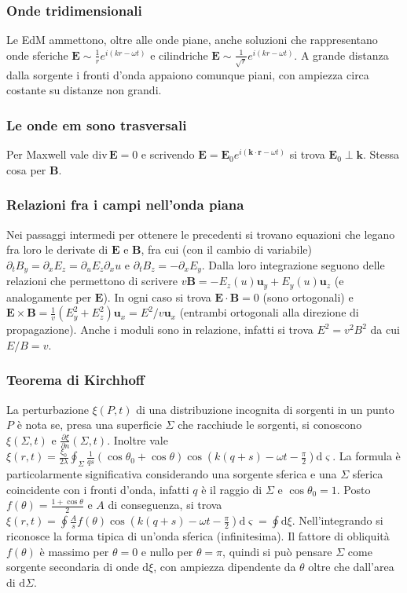 \documentclass[11pt,a4paper]{article}
\newcommand{\de}{\mathrm d}
\newcommand{\fracp}[2]{\frac{\partial #1}{\partial #2}}
\newcommand{\dive}[1]{\text{div}\,#1}
\begin{document}
\subsubsection{Onde tridimensionali}
Le EdM ammettono, oltre alle onde piane, anche soluzioni che rappresentano onde sferiche $\mathbf E \sim \frac1r e^{i(kr -\omega t)}$ e cilindriche $\mathbf E \sim \frac1{\sqrt{r}} e^{i(kr -\omega t)}$. A grande distanza dalla sorgente i fronti d'onda appaiono comunque piani, con ampiezza circa costante su distanze non grandi.

\subsubsection{Le onde em sono trasversali}
Per Maxwell vale $\dive\mathbf E= 0$ e scrivendo $\mathbf E = \mathbf E_0 e^{i(\mathbf k \cdot \mathbf r - \omega t)}$ si trova $\mathbf E_0 \perp \mathbf k$. Stessa cosa per $\mathbf B$.

\subsubsection{Relazioni fra i campi nell'onda piana}
Nei passaggi intermedi per ottenere le precedenti si trovano equazioni che legano fra loro le derivate di $\mathbf E$ e $\mathbf B$, fra cui (con il cambio di variabile) $\partial_t B_y = \partial_x E_z = \partial_u E_z \partial_x u$ e $\partial_t B_z = -\partial_x E_y$. Dalla loro integrazione seguono delle relazioni che permettono di scrivere $v \mathbf B = -E_z(u) \mathbf u_y + E_y(u) \mathbf u_z$ (e analogamente per $\mathbf E$). In ogni caso si trova $\mathbf E \cdot \mathbf B = 0$ (sono ortogonali) e $\mathbf E \times \mathbf B = \frac1v (E_y^2 + E_z^2) \mathbf u_x = E^2/v \mathbf u_x$ (entrambi ortogonali alla direzione di propagazione). Anche i moduli sono in relazione, infatti si trova $E^2 = v^2 B^2$ da cui $E/B = v$.

\subsubsection{Teorema di Kirchhoff}
La perturbazione $\xi(P, t)$ di una distribuzione incognita di sorgenti in un punto $P$ è nota se, presa una superficie $\Sigma$ che racchiude le sorgenti, si conoscono $\xi(\Sigma,t)$ e $\fracp{\xi}{n}(\Sigma,t)$. Inoltre vale $\xi(r,t) = \frac{\xi_0}{2\lambda} \oint_\Sigma \frac1{qs} (\cos\theta_0 + \cos\theta) \cos(k(q+s) - \omega t - \frac\pi 2) \de\varsigma$. La formula è particolarmente significativa considerando una sorgente sferica e una $\Sigma$ sferica coincidente con i fronti d'onda, infatti $q$ è il raggio di $\Sigma$ e $\cos\theta_0 = 1$. Posto $f(\theta) = \frac{1+\cos\theta}2$ e $A$ di conseguenza, si trova $\xi(r,t) = \oint \frac{A}s f(\theta) \cos(k(q+s) - \omega t - \frac\pi 2) \de\varsigma = \oint \de\xi$. Nell'integrando si riconosce la forma tipica di un'onda sferica (infinitesima). Il fattore di obliquità $f(\theta)$ è massimo per $\theta=0$ e nullo per $\theta=\pi$, quindi si può pensare $\Sigma$ come sorgente secondaria di onde $\de\xi$, con ampiezza dipendente da $\theta$ oltre che dall'area di $\de\Sigma$.
\end{document}

